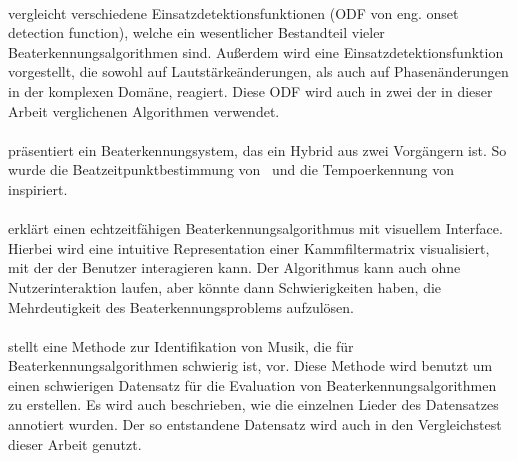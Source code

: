 \paragraph{\cite{2004_BeDaDuSa}}
{
	vergleicht verschiedene Einsatzdetektionsfunktionen (ODF von eng. onset detection function),
		welche ein wesentlicher Bestandteil vieler Beaterkennungsalgorithmen sind.
	Au{\ss}erdem wird eine Einsatzdetektionsfunktion vorgestellt,
		die sowohl auf Lautstärkeänderungen,
		als auch auf Phasenänderungen in der komplexen Domäne,
		reagiert.
	Diese ODF wird auch in zwei der in dieser Arbeit verglichenen Algorithmen verwendet.
}

\paragraph{\cite{2009_DaPlSt}}
{
	präsentiert ein Beaterkennungsystem,
		das ein Hybrid aus zwei Vorgängern ist.
	So wurde die Beatzeitpunktbestimmung von~\cite{2007_El}
		und die Tempoerkennung von~\cite{2007_DaPl} inspiriert.
}

\paragraph{\cite{2011_PlRoSt}}
{
	erklärt einen echtzeitfähigen Beaterkennungsalgorithmus mit visuellem Interface.
	Hierbei wird eine intuitive Representation einer Kammfiltermatrix visualisiert,
		mit der der Benutzer interagieren kann.
	Der Algorithmus kann auch ohne Nutzerinteraktion laufen,
		aber könnte dann Schwierigkeiten haben,
		die Mehrdeutigkeit des Beaterkennungsproblems aufzulösen.
}


\paragraph{\cite{2012_HoDaZaOlGo}}
{
	stellt eine Methode zur Identifikation von Musik,
		die für Beaterkennungsalgorithmen schwierig ist,
		vor.
	Diese Methode wird benutzt um einen schwierigen Datensatz für die Evaluation von Beaterkennungsalgorithmen zu erstellen.
	Es wird auch beschrieben,
		wie die einzelnen Lieder des Datensatzes annotiert wurden.
	Der so entstandene Datensatz wird auch in den Vergleichstest dieser Arbeit genutzt.
}
